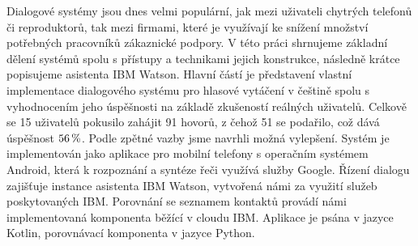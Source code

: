 \documentclass[12pt]{report}
\begin{document}

Dialogové systémy jsou dnes velmi populární, jak mezi uživateli chytrých
telefonů či reproduktorů, tak mezi firmami, které je využívají ke snížení
množství potřebných pracovníků zákaznické podpory. V této práci
shrnujeme základní dělení systémů spolu s přístupy a technikami
jejich konstrukce, následně krátce popisujeme asistenta IBM Watson.
Hlavní částí je představení vlastní implementace dialogového systému
pro hlasové vytáčení v češtině spolu s vyhodnocením jeho úspěšnosti
na základě zkušeností reálných uživatelů. Celkově se 15 uživatelů pokusilo
zahájit 91 hovorů, z čehož 51 se podařilo, což dává úspěšnost \(56\,\rm \%\).
Podle zpětné vazby jsme navrhli možná vylepšení. Systém je implementován jako aplikace
pro mobilní telefony s operačním systémem Android, která k rozpoznání
a syntéze řeči využívá služby Google. Řízení dialogu zajišťuje instance asistenta
IBM Watson, vytvořená námi za využití služeb poskytovaných IBM.
Porovnání se seznamem kontaktů provádí námi implementovaná komponenta běžící
v cloudu IBM. Aplikace je psána v jazyce Kotlin, porovnávací komponenta
v jazyce Python.
\end{document}
